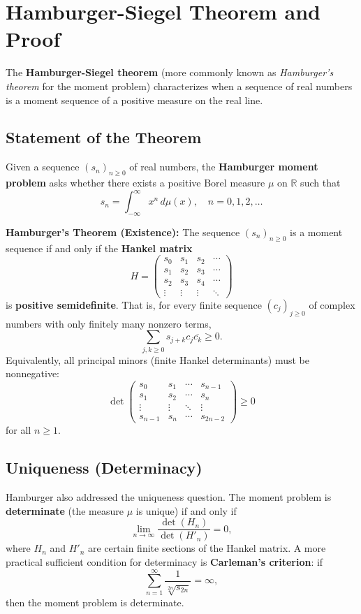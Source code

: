 \documentclass{article}
\begin{document}
\section*{Hamburger-Siegel Theorem and Proof}

The \textbf{Hamburger-Siegel theorem} (more commonly known as \emph{Hamburger's theorem} for the moment problem) characterizes when a sequence of real numbers is a moment sequence of a positive measure on the real line.

\subsection*{Statement of the Theorem}

Given a sequence $(s_n)_{n \geq 0}$ of real numbers, the \textbf{Hamburger moment problem} asks whether there exists a positive Borel measure $\mu$ on $\mathbb{R}$ such that
\[
s_n = \int_{-\infty}^{\infty} x^n \, d\mu(x), \quad n = 0, 1, 2, \ldots
\]

\textbf{Hamburger's Theorem (Existence):} The sequence $(s_n)_{n \geq 0}$ is a moment sequence if and only if the \textbf{Hankel matrix}
\[
H = \begin{pmatrix}
s_0 & s_1 & s_2 & \cdots \\
s_1 & s_2 & s_3 & \cdots \\
s_2 & s_3 & s_4 & \cdots \\
\vdots & \vdots & \vdots & \ddots
\end{pmatrix}
\]
is \textbf{positive semidefinite}. That is, for every finite sequence $(c_j)_{j \geq 0}$ of complex numbers with only finitely many nonzero terms,
\[
\sum_{j,k \geq 0} s_{j+k} c_j \overline{c_k} \geq 0.
\]
Equivalently, all principal minors (finite Hankel determinants) must be nonnegative:
\[
\det \begin{pmatrix}
s_0 & s_1 & \cdots & s_{n-1} \\
s_1 & s_2 & \cdots & s_n \\
\vdots & \vdots & \ddots & \vdots \\
s_{n-1} & s_n & \cdots & s_{2n-2}
\end{pmatrix} \geq 0
\]
for all $n \geq 1$.

\subsection*{Uniqueness (Determinacy)}

Hamburger also addressed the uniqueness question. The moment problem is \textbf{determinate} (the measure $\mu$ is unique) if and only if
\[
\lim_{n \to \infty} \frac{\det(H_n)}{\det(H'_n)} = 0,
\]
where $H_n$ and $H'_n$ are certain finite sections of the Hankel matrix. A more practical sufficient condition for determinacy is \textbf{Carleman's criterion}: if
\[
\sum_{n=1}^{\infty} \frac{1}{\sqrt[2n]{s_{2n}}} = \infty,
\]
then the moment problem is determinate.
\end{document}
